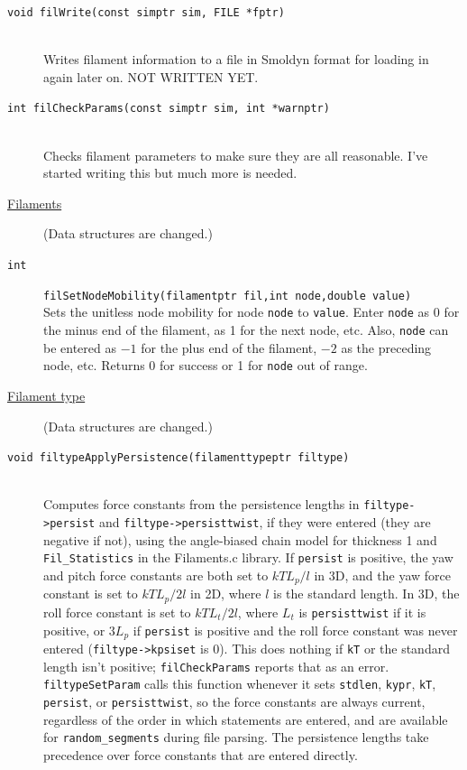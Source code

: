 \documentclass {scrbook}
\newcommand {\ttt} {\texttt}
\begin{document}
\begin{description}
\item[\ttt{void filWrite(const simptr sim, FILE *fptr)}]
\hfill \\
Writes filament information to a file in Smoldyn format for loading in again later on. NOT WRITTEN YET.

\item[\ttt{int filCheckParams(const simptr sim, int *warnptr)}]
\hfill \\
Checks filament parameters to make sure they are all reasonable. I've started writing this but much more is needed.

\item[\underline{Filaments}]
(Data structures are changed.)

\item[\ttt{int}]
\ttt{filSetNodeMobility(filamentptr fil,int node,double value)}
\hfill \\
Sets the unitless node mobility for node \ttt{node} to \ttt{value}. Enter \ttt{node} as 0 for the minus end of the filament, as 1 for the next node, etc. Also, \ttt{node} can be entered as $-1$ for the plus end of the filament, $-2$ as the preceding node, etc. Returns 0 for success or 1 for \ttt{node} out of range.


\item[\underline{Filament type}]
(Data structures are changed.)

\item[\ttt{void filtypeApplyPersistence(filamenttypeptr filtype)}]
\hfill \\
Computes force constants from the persistence lengths in \ttt{filtype->persist} and \ttt{filtype->persisttwist}, if they were entered (they are negative if not), using the angle-biased chain model for thickness 1 and \ttt{Fil\_Statistics} in the Filaments.c library. If \ttt{persist} is positive, the yaw and pitch force constants are both set to $kT L_p/l$ in 3D, and the yaw force constant is set to $kT L_p/2l$ in 2D, where $l$ is the standard length. In 3D, the roll force constant is set to $kT L_t/2l$, where $L_t$ is \ttt{persisttwist} if it is positive, or $3L_p$ if \ttt{persist} is positive and the roll force constant was never entered (\ttt{filtype->kpsiset} is 0). This does nothing if \ttt{kT} or the standard length isn't positive; \ttt{filCheckParams} reports that as an error. \ttt{filtypeSetParam} calls this function whenever it sets \ttt{stdlen}, \ttt{kypr}, \ttt{kT}, \ttt{persist}, or \ttt{persisttwist}, so the force constants are always current, regardless of the order in which statements are entered, and are available for \ttt{random\_segments} during file parsing. The persistence lengths take precedence over force constants that are entered directly.


\end{description}
\end{document}
